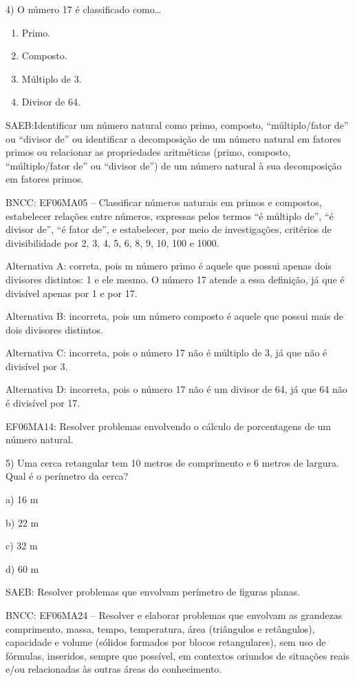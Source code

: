4) O número 17 é classificado como\ldots{}

\begin{enumerate}
\def\labelenumi{\alph{enumi})}
\item
  Primo.
\item
  Composto.
\item
  Múltiplo de 3.
\item
  Divisor de 64.
\end{enumerate}

SAEB:Identificar um número natural como primo, composto,
``múltiplo/fator de'' ou ``divisor de'' ou identificar a decomposição de
um número natural em fatores primos ou relacionar as propriedades
aritméticas (primo, composto, ``múltiplo/fator de'' ou ``divisor de'')
de um número natural à sua decomposição em fatores primos.

BNCC: EF06MA05 -- Classificar números naturais em primos e compostos,
estabelecer relações entre números, expressas pelos termos ``é múltiplo
de'', ``é divisor de'', ``é fator de'', e estabelecer, por meio de
investigações, critérios de divisibilidade por 2, 3, 4, 5, 6, 8, 9, 10,
100 e 1000.

Alternativa A: correta, pois m número primo é aquele que possui apenas
dois divisores distintos: 1 e ele mesmo. O número 17 atende a essa
definição, já que é divisível apenas por 1 e por 17.

Alternativa B: incorreta, pois um número composto é aquele que possui
mais de dois divisores distintos.

Alternativa C: incorreta, pois o número 17 não é múltiplo de 3, já que
não é divisível por 3.

Alternativa D: incorreta, pois o número 17 não é um divisor de 64, já
que 64 não é divisível por 17.

EF06MA14: Resolver problemas envolvendo o cálculo de porcentagens de um
número natural.

5) Uma cerca retangular tem 10 metros de comprimento e 6 metros de
largura. Qual é o perímetro da cerca?

a) 16 m

b) 22 m

c) 32 m

d) 60 m

SAEB: Resolver problemas que envolvam perímetro de figuras planas.

BNCC: EF06MA24 -- Resolver e elaborar problemas que envolvam as
grandezas comprimento, massa, tempo, temperatura, área (triângulos e
retângulos), capacidade e volume (sólidos formados por blocos
retangulares), sem uso de fórmulas, inseridos, sempre que possível, em
contextos oriundos de situações reais e/ou relacionadas às outras áreas
do conhecimento.

